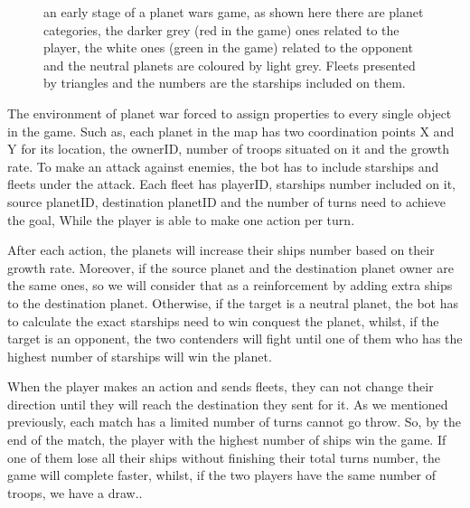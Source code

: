 \documentclass[]{interact}
\theoremstyle{plain}%
\theoremstyle{definition}
\theoremstyle{remark}
\begin{document}
\begin{figure}
\caption{an early stage of a planet wars game, as shown here there are planet categories, the darker grey (red in the game) ones related to the player, the white ones (green in the game) related to the opponent and the neutral planets are coloured by light grey. Fleets presented by triangles and the numbers are the starships included on them.}
\end{figure}

The environment of planet war forced to assign properties to every single object in the game.\cite{doc1} Such as, each planet in the map has two coordination points X and Y for its location, the ownerID, number of troops situated on it and the growth rate. To make an attack against enemies, the bot has to include starships and fleets under the attack. Each fleet has playerID, starships number included on it, source planetID, destination planetID and the number of turns need to achieve the goal, While the player is able to make one action per turn.\cite{doc1}

After each action, the planets will increase their ships number based on their growth rate.\cite{doc5, lucas} Moreover, if the source planet and the destination planet owner are the same ones, so we will consider that as a reinforcement by adding extra ships to the destination planet. Otherwise, if the target is a neutral planet, the bot has to calculate the exact starships need to win conquest the planet, whilst, if the target is an opponent, the two contenders will fight until one of them who has the highest number of starships will win the planet.\cite{doc1,doc5}

When the player makes an action and sends fleets, they can not change their direction until they will reach the destination they sent for it. As we mentioned previously, each match has a limited number of turns cannot go throw. So, by the end of the match, the player with the highest number of ships win the game. If one of them lose all their ships without finishing their total turns number, the game will complete faster, whilst, if the two players have the same number of troops, we have a draw.\cite{doc5}. 
\end{document}
